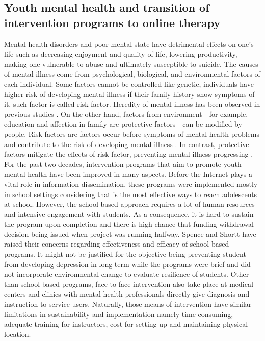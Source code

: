 \subsection*{Youth mental health and transition of intervention programs to online therapy}
Mental health disorders and poor mental state have detrimental effects on one's life such as decreasing enjoyment and quality of life, lowering productivity, making one vulnerable to abuse and ultimately susceptible to suicide. The causes of mental illness come from psychological, biological, and environmental factors of each individual. Some factors cannot be controlled like genetic, individuals have higher risk of developing mental illness if their family history show symptoms of it, such factor is called risk factor. Heredity of mental illness has been observed in previous studies \cite{Hyman2000}. On the other hand, factors from environment - for example, education and affection in family are protective factors - can be modified by people. Risk factors are factors occur before symptoms of mental health problems and contribute to the risk of developing mental illness \cite{KAZDIN1997375}. In contrast, protective factors mitigate the effects of risk factor, preventing mental illness progressing \cite{shortt_spence_2006}. \\
For the past two decades, intervention programs that aim to promote youth mental health have been improved in many aspects. Before the Internet plays a vital role in information dissemination, these programs were implemented mostly in school settings considering that is the most effective ways to reach adolescents at school. However, the school-based approach requires a lot of human resources and intensive engagement with students. As a consequence, it is hard to sustain the program upon completion and there is high chance that funding withdrawal decision being issued when project was running halfway. Spence and Shortt \cite{JCPP:JCPP1738} have raised their concerns regarding effectiveness and efficacy of school-based programs. It might not be justified for the objective being preventing student from developing depression in long term while the programs were brief and did not incorporate environmental change to evaluate resilience of students. Other than school-based programs, face-to-face intervention also take place at medical centers and clinics with mental health professionals directly give diagnosis and instruction to service users. Naturally, those means of intervention have similar limitations in sustainability and implementation namely time-consuming, adequate training for instructors, cost for setting up and maintaining physical location.\\
